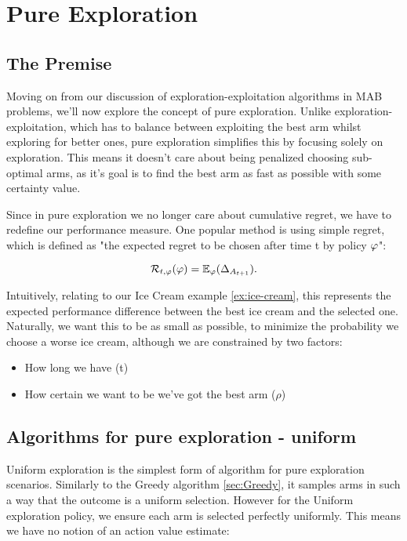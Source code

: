 \chapter{Pure Exploration}
\label{cha:pureexploration}

\section{The Premise}
\label{sec:premise}
Moving on from our discussion of exploration-exploitation algorithms in MAB problems, we'll now explore the concept of pure exploration. Unlike exploration-exploitation, which has to balance between exploiting the best arm whilst exploring for better ones, pure exploration simplifies this by focusing solely on exploration. This means it doesn't care about being penalized choosing sub-optimal arms, as it's goal is to find the best arm as fast as possible with some certainty value.

Since in pure exploration we no longer care about cumulative regret, we have to redefine our performance measure. One popular method is using simple regret, which is defined as "the expected regret to be chosen after time t by policy $\varphi$":

$$\mathcal{R}_{t, \varphi}(\varphi) = \mathbb{E}_{\varphi}(\Delta_{A_{t+1}}).$$

Intuitively, relating to our Ice Cream example \ref{ex:ice-cream}, this represents the expected performance difference between the best ice cream and the selected one. Naturally, we want this to be as small as possible, to minimize the probability we choose a worse ice cream, although we are constrained by two factors:

\begin{itemize}
    \item How long we have (t)
    \item How certain we want to be we've got the best arm ($\rho$)
\end{itemize}

\section{Algorithms for pure exploration - uniform}
\label{sec:simpleregret}

Uniform exploration is the simplest form of algorithm for pure exploration scenarios. Similarly to the Greedy algorithm \ref{sec:Greedy}, it samples arms in such a way that the outcome is a uniform selection. However for the Uniform exploration policy, we ensure each arm is selected perfectly uniformly. This means we have no notion of an action value estimate:

